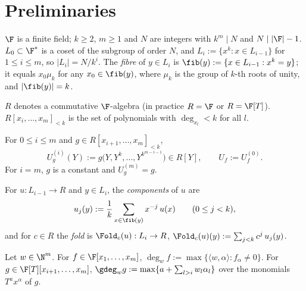 \section{Preliminaries}\label{sec:prelim}

\begin{definition}\label{def:domains}
$\F$ is a finite field; $k\ge 2$, $m\ge 1$ and $N$ are integers with $k^m\mid N$ and
$N\mid |\F|-1$. $L_0\subset\F^*$ is a coset of the subgroup of order $N$, and
$L_i:=\{x^k: x\in L_{i-1}\}$ for $1\le i\le m$, so $|L_i|=N/k^i$. The \emph{fibre} of
$y\in L_i$ is $\fib(y):=\{x\in L_{i-1}: x^k=y\}$; it equals $x_0\mu_k$ for any
$x_0\in\fib(y)$, where $\mu_k$ is the group of $k$-th roots of unity, and $|\fib(y)|=k$.
\end{definition}

\begin{definition}[Polynomials]\label{def:poly}
$R$ denotes a commutative $\F$-algebra (in practice $R=\F$ or $R=\F[T]$).
$R[x_i,\dots,x_m]_{<k}$ is the set of polynomials with $\deg_{x_l}<k$ for all $l$.
\end{definition}

\begin{definition}\label{def:kron}
For $0\le i\le m$ and $g\in R[x_{i+1},\dots,x_m]_{<k}$,
\[
U^{(i)}_g(Y):=g\big(Y,Y^{k},\dots,Y^{k^{m-i-1}}\big)\in R[Y],\qquad U_f:=U^{(0)}_f .
\]
For $i=m$, $g$ is a constant and $U^{(m)}_g=g$.
\end{definition}

\begin{definition}[Fold]\label{def:fold}
For $u:L_{i-1}\to R$ and $y\in L_i$, the \emph{components} of $u$ are
\[
u_j(y):=\frac1k\sum_{x\in\fib(y)}x^{-j}\,u(x)\qquad(0\le j<k),
\]
and for $c\in R$ the \emph{fold} is $\Fold_c(u):L_i\to R$,
$\Fold_c(u)(y):=\sum_{j<k}c^j\,u_j(y)$.
\end{definition}

\begin{definition}\label{def:wdeg}
Let $w\in\N^m$. For $f\in\F[x_1,\dots,x_m]$,
$\deg_w f:=\max\{\langle w,\alpha\rangle: f_\alpha\ne0\}$.
For $g\in\F[T][x_{i+1},\dots,x_m]$, $\gdeg_w g:=\max\{a+\sum_{l>i}w_l\alpha_l\}$
over the monomials $T^a x^\alpha$ of $g$.
\end{definition}

